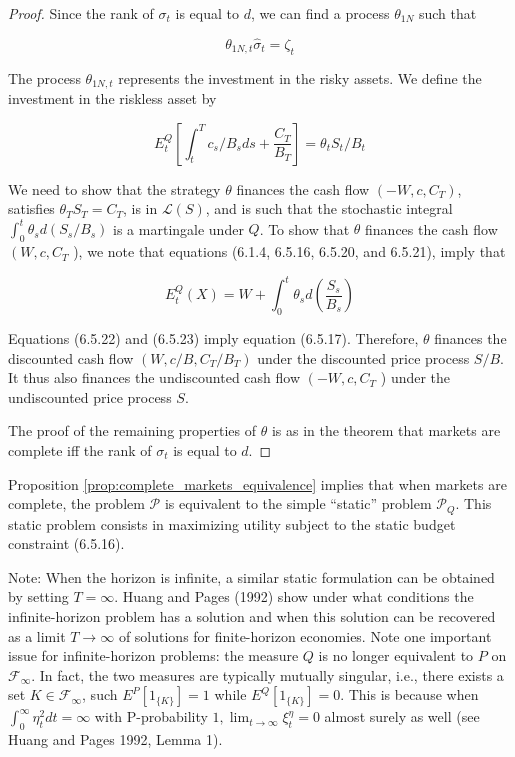 \documentclass[\topdir/lecture\_notes.tex]{subfiles}
\begin{document}
\begin{proof}
Since the rank of $\sigma_{t}$ is equal to $d$, we can find a process $\theta_{1 N}$ such that

\begin{equation}
\theta_{1 N, t} \hat{\sigma}_{t}=\zeta_{t} \label{eq:6.5.21}
\end{equation}

The process $\theta_{1 N, t}$ represents the investment in the risky assets. We define the investment in the riskless asset by

\begin{equation}
E_{t}^{Q}\left[\int_{t}^{T} c_{s}/B_{s} d s+\frac{C_{T}}{B_{T}}\right]=\theta_{t} S_{t}/B_{t} \label{eq:6.5.22}
\end{equation}

We need to show that the strategy $\theta$ finances the cash flow $\left(-W, c, C_{T}\right)$, satisfies $\theta_{T} S_{T}=C_{T}$, is in $\mathcal{L}(S)$, and is such that the stochastic integral $\int_{0}^{t} \theta_{s} d\left(S_{s} / B_{s}\right)$ is a martingale under $Q$. To show that $\theta$ finances the cash flow $\left(W, c, C_{T}\right.$ ), we note that equations (6.1.4, 6.5.16, 6.5.20, and 6.5.21), imply that

\begin{equation}
E_{t}^{Q}(X)=W+\int_{0}^{t} \theta_{s} d\left(\frac{S_{s}}{B_{s}}\right) \label{eq:6.5.23}
\end{equation}

Equations (6.5.22) and (6.5.23) imply equation (6.5.17). Therefore, $\theta$ finances the discounted cash flow $\left(W, c / B, C_{T} / B_{T}\right)$ under the discounted price process $S / B$. It thus also finances the undiscounted cash flow $\left(-W, c, C_{T}\right.$ ) under the undiscounted price process $S$.

The proof of the remaining properties of $\theta$ is as in the theorem that markets are complete iff the rank of $\sigma_{t}$ is equal to $d$.

\end{proof}

Proposition \ref{prop:complete_markets_equivalence} implies that when markets are complete, the problem $\mathcal{P}$ is equivalent to the simple ``static'' problem $\mathcal{P}_{Q}$. This static problem consists in maximizing utility subject to the static budget constraint (6.5.16).

Note: When the horizon is infinite, a similar static formulation can be obtained by setting $T=\infty$. Huang and Pages (1992) show under what conditions the infinite-horizon problem has a solution and when this solution can be recovered as a limit $T \rightarrow \infty$ of solutions for finite-horizon economies. Note one important issue for infinite-horizon problems: the measure $Q$ is no longer equivalent to $P$ on $\mathcal{F}_{\infty}$. In fact, the two measures are typically mutually singular, i.e., there exists a set $K \in \mathcal{F}_{\infty}$, such $E^{P}\left[1_{\{K\}}\right]=1$ while $E^{Q}\left[1_{\{K\}}\right]=0$. This is because when $\int_{0}^{\infty} \eta_{t}^{2} d t=\infty$ with P-probability $1, \lim _{t \rightarrow \infty} \xi_{t}^{\eta}=0$ almost surely as well (see Huang and Pages 1992, Lemma 1).
\end{document}
